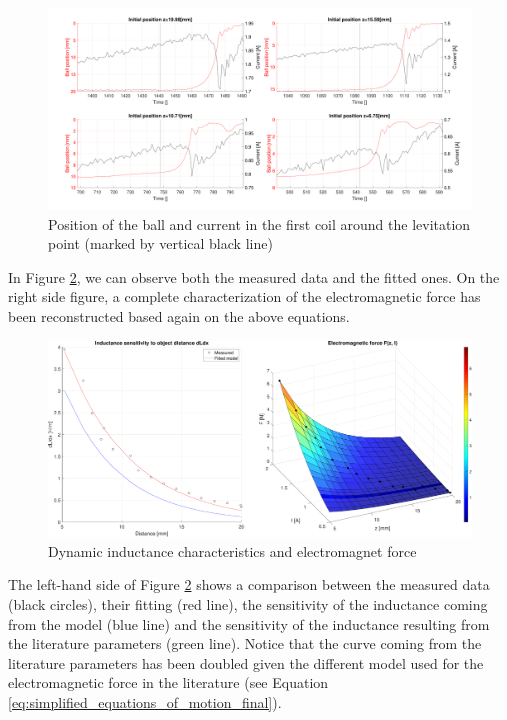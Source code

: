 \begin{figure}[H]
    \centering
    \includegraphics[width=1\textwidth]{img/MATLAB/identification/currents_for_force.pdf}
    \caption{Position of the ball and current in the first coil around the levitation point (marked by vertical black line)}
    \label{fig:levitation_current}
\end{figure}

In Figure \ref{fig:dynamic_inductance_characteristics}, we can observe both the measured data and the fitted ones.
On the right side figure, a complete characterization of the electromagnetic force has been reconstructed based again on the above equations.

\begin{figure}[H]
    \centering
    \includegraphics[width=1\textwidth]{img/MATLAB/identification/force.pdf}
    \caption{Dynamic inductance characteristics and electromagnet force}
    \label{fig:dynamic_inductance_characteristics}
\end{figure}

The left-hand side of Figure \ref{fig:dynamic_inductance_characteristics} shows a comparison between the measured data (black circles), their fitting (red line), the sensitivity of the inductance coming from the model (blue line) and the sensitivity of the inductance resulting from the literature parameters (green line).
Notice that the curve coming from the literature parameters has been doubled given the different model used for the electromagnetic force in the literature (see Equation \ref{eq:simplified_equations_of_motion_final}).

